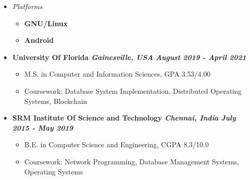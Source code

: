 \documentclass[9]{Resume}
\begin{document}
\begin{minipage}[t]{0.45\textwidth}
\begin{itemize}[noitemsep,nolistsep,leftmargin=*]
	\item[]\textit{Platforms}
			\vspace{-1em}
			\begin{multicols}{2}
			\begin{itemize}[leftmargin=*]
			\setlength\itemsep{-0.25em}
			\item[]\textbf{GNU/Linux}\hspace{5pt}
			\item[]\textbf{Android}\hspace{5pt}
			\end{itemize}
			\end{multicols}
	\end{itemize}
		
\end{minipage}


\begin{itemize}[noitemsep,nolistsep]
	\item[]\textbf{University Of Florida \textit{{\scriptsize Gainesville, USA}} \hfill \textit{August 2019 - April 2021}}
		\begin{itemize}[leftmargin=*]
			\setlength\itemsep{-0.25em}
			\item[\textbullet]M.S. in Computer and Information Sciences, GPA 3.53/4.00
			\item[\textbullet]{\small Coursework: Database System Implementation, Distributed Operating Systems, Blockchain}
		\end{itemize}
	\item[]\textbf{SRM Institute Of Science and Technology \textit{{\scriptsize Chennai, India}} \hfill \textit{July 2015 - May 2019}}
		\begin{itemize}[leftmargin=*]
			\setlength\itemsep{-0.25em}
			\item[\textbullet]B.E. in Computer Science and Engineering, CGPA 8.3/10.0
			\item[\textbullet]{\small Coursework: Network Programming, Database Management Systems, Operating Systems}
		\end{itemize}
\end{itemize}
\end{document}
